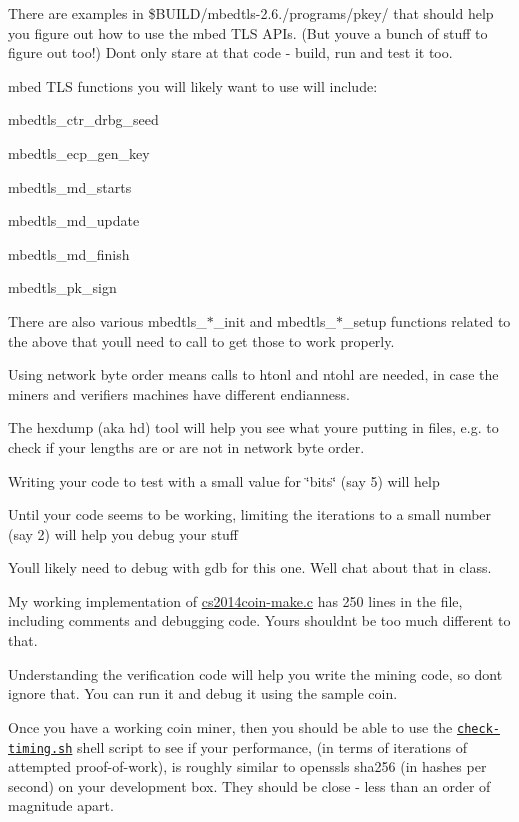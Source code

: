 \begin{DoxyItemize}
\item There are examples in {\ttfamily \$\+B\+U\+I\+LD/mbedtls-\/2.6./programs/pkey/} that should help you figure out how to use the mbed T\+LS A\+P\+Is. (But you\textquotesingle{}ve a bunch of stuff to figure out too!) Don\textquotesingle{}t only stare at that code -\/ build, run and test it too.
\item mbed T\+LS functions you will likely want to use will include\+:
\begin{DoxyItemize}
\item {\ttfamily mbedtls\+\_\+ctr\+\_\+drbg\+\_\+seed}
\item {\ttfamily mbedtls\+\_\+ecp\+\_\+gen\+\_\+key}
\item {\ttfamily mbedtls\+\_\+md\+\_\+starts}
\item {\ttfamily mbedtls\+\_\+md\+\_\+update}
\item {\ttfamily mbedtls\+\_\+md\+\_\+finish}
\item {\ttfamily mbedtls\+\_\+pk\+\_\+sign}
\end{DoxyItemize}
\item There are also various {\ttfamily mbedtls\+\_\+$\ast$\+\_\+init} and {\ttfamily mbedtls\+\_\+$\ast$\+\_\+setup} functions related to the above that you\textquotesingle{}ll need to call to get those to work properly.
\item Using network byte order means calls to {\ttfamily htonl} and {\ttfamily ntohl} are needed, in case the miner\textquotesingle{}s and verifier\textquotesingle{}s machines have different endianness.
\item The {\ttfamily hexdump} (aka {\ttfamily hd}) tool will help you see what you\textquotesingle{}re putting in files, e.\+g. to check if your lengths are or are not in network byte order.
\item Writing your code to test with a small value for \char`\"{}bits\char`\"{} (say 5) will help
\item Until your code seems to be working, limiting the iterations to a small number (say 2) will help you debug your stuff
\item You\textquotesingle{}ll likely need to debug with {\ttfamily gdb} for this one. We\textquotesingle{}ll chat about that in class.
\item My working implementation of {\ttfamily \hyperlink{cs2014coin-make_8c}{cs2014coin-\/make.\+c}} has 250 lines in the file, including comments and debugging code. Yours shouldn\textquotesingle{}t be too much different to that.
\item Understanding the verification code will help you write the mining code, so don\textquotesingle{}t ignore that. You can run it and debug it using the sample coin.
\item Once you have a working coin miner, then you should be able to use the \href{./check-timing.sh}{\tt check-\/timing.\+sh} shell script to see if your performance, (in terms of iterations of attempted proof-\/of-\/work), is roughly similar to openssl\textquotesingle{}s sha256 (in hashes per second) on your development box. They should be close -\/ less than an order of magnitude apart.
\end{DoxyItemize}

